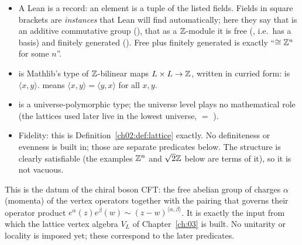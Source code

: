 \begin{dictionary}
\begin{itemize}
\item A Lean  is a record: an element  is a tuple of
  the listed fields.  Fields in square brackets are \emph{instances} that Lean will find
  automatically; here they say that  is an additive commutative group
  (), that as a ${\mathbb{Z}}$-module it is free (, i.e.\ has a
  basis) and finitely generated ().  Free plus finitely generated is
  exactly ``$\cong{\mathbb{Z}}^n$ for some $n$''.
\item {} is Mathlib's type of ${\mathbb{Z}}$-bilinear maps $L\times
  L\to{\mathbb{Z}}$, written in curried form:  is $\langle x,y\rangle$.
   means $\langle x,y\rangle=\langle y,x\rangle$ for all $x,y$.
\item {} is a universe-polymorphic type; the universe level plays no mathematical
  role (the lattices used later live in the lowest universe,  $=$ ).
\item Fidelity: this is Definition~\ref{ch02:def:lattice} exactly.  No definiteness or
  evenness is built in; those are separate predicates below.  The structure is clearly
  satisfiable (the examples ${\mathbb{Z}}^n$ and $\sqrt2{\mathbb{Z}}$ below are terms of it), so it is not vacuous.
\end{itemize}
\end{dictionary}
\begin{physics}
This is the datum of the chiral boson CFT: the free abelian group of charges $\alpha$ (momenta) of the vertex operators together with the pairing that governs their operator product $e^{\alpha}(z)e^{\beta}(w)\sim(z-w)^{\langle\alpha,\beta\rangle}$. It is exactly the input from which the lattice vertex algebra $V_L$ of Chapter~\ref{ch:03} is built. No unitarity or locality is imposed yet; these correspond to the later predicates.
\end{physics}

